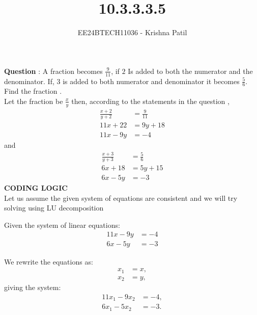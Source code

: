 \documentclass[journal]{IEEEtran}
\begin{document}

\vspace{3cm}

\title{10.3.3.3.5}
\author{EE24BTECH11036 - Krishna Patil}
{\let\newpage\relax\maketitle}

\renewcommand{\thefigure}{\theenumi}
\renewcommand{\thetable}{\theenumi}
\setlength{\intextsep}{10pt} %

\renewcommand{\thefigure}{\theenumi}
\renewcommand{\thetable}{\theenumi}
\setlength{\intextsep}{10pt} %


\textbf{Question} : A fraction becomes $\frac{9}{11}$, if $2$ Is added to both the numerator and the denominator. If, $3$ is added to both numerator and denominator it becomes $\frac{5}{6}$. Find the fraction . \\

\solution
Let the fraction be $\frac{x}{y}$ then, according to the statements in the question ,
\begin{align}
\frac{x+2}{y+2} &= \frac{9}{11} \\
11x + 22 &= 9y + 18 \\
11x - 9y &= -4 
\end{align}
and
\begin{align}
	\frac{x+3}{y+3} &= \frac{5}{6} \\
	6x+18 &= 5y+15 \\
	6x - 5y &= -3
\end{align}
\textbf{CODING LOGIC}\\


	Let us assume the given system of equations are consistent and we will try solving using LU decomposition
	
	Given the system of linear equations:
	\begin{align}
		11x-9y &= -4 \\
		6x-5y &= -3
	\end{align}
	
	We rewrite the equations as:
	\begin{align}
		x_1 &= x, \\
		x_2 &= y,
	\end{align}
	giving the system:
	\begin{align}
		11x_1 - 9x_2 &= -4, \\
		6x_1 - 5x_2 &= -3.
	\end{align}
	
\end{document}
